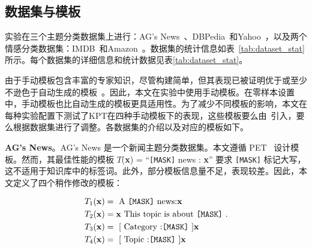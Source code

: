 \subsection{数据集与模板}

实验在三个主题分类数据集上进行：AG's News~\cite{zhang2015character}、DBPedia~\cite{lehmann2015dbpedia}和Yahoo~\cite{zhang2015character}，以及两个情感分类数据集：IMDB~\cite{maas2011learning}和Amazon~\cite{mcauley2013hidden}。数据集的统计信息如表~\ref{tab:dataset_stat}所示。每个数据集的详细信息和统计数据见表\ref{tab:dataset_stat}。

\begin{table}[!htbp]
    \centering
    \caption{各数据集的统计信息。}
    \label{tab:dataset_stat}
\end{table}

由于手动模板包含丰富的专家知识，尽管构建简单，但其表现已被证明优于或至少不逊色于自动生成的模板~\cite{gao2020making}。因此，本文在实验中使用手动模板。在零样本设置中，手动模板也比自动生成的模板更具适用性。为了减少不同模板的影响，本文在每种实验配置下测试了KPT在四种手动模板下的表现，这些模板要么由~\cite{schick2020exploiting}引入，要么根据数据集进行了调整。各数据集的介绍以及对应的模板如下。

\textbf{AG's News}。AG's News 是一个新闻主题分类数据集。本文遵循 PET~\cite{schick2020exploiting} 设计模板。然而，其最佳性能的模板 $T$(\textbf{x}) =  ``\texttt{[MASK]} news : \textbf{x}'' 要求 \texttt{[MASK]} 标记大写，这不适用于知识库中的标签词。此外，部分模板信息量不足，表现较差。因此，本文定义了四个稍作修改的模板：



{\centering
\begin{mybox}
\begin{align*}
 T_1(\mathbf{x}) &= \text{ A \texttt{[MASK]} news:} \mathbf{x} \\
 T_2(\mathbf{x}) &= \mathbf{x} \text{ This topic is about \texttt{[MASK]} .}\\
  T_3(\mathbf{x}) &=  \text{ [ Category :\texttt{[MASK]} ]} \mathbf{x}\\
  T_4(\mathbf{x}) &=  \text{ [ Topic :\texttt{[MASK]} ]} \mathbf{x}
\end{align*}
\end{mybox}
}

